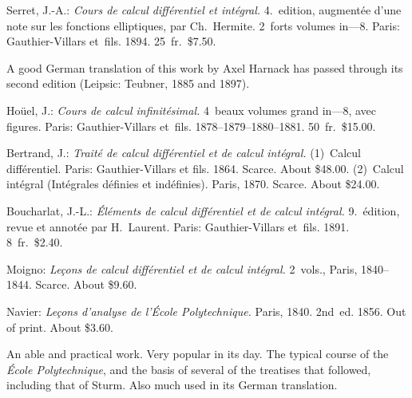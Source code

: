 \documentclass[12pt]{book}[2005/09/16]
\newcommand{\Typo}[2]{#2}
\newlength{\ParIndent}
\newenvironment{Book}{\medskip\par\noindent\hangindent\ParIndent\ignorespaces}{\par}
\newenvironment{Descrip}{%
  \begin{list}{}{%
      \setlength{\leftmargin}{1.5\ParIndent}%
      \setlength{\itemindent}{\ParIndent}%
      \setlength{\listparindent}{\ParIndent}%
      \setlength{\topsep}{4pt}%
      \item\small\ignorespaces%
  }%
}{%
\end{list}}
\newcommand{\Pagelabel}[1]{\phantomsection\label{page:#1}}
\newcommand{\PageSep}[1]{\Pagelabel{#1}\ignorespaces}
\renewcommand{\(}{{\upshape(}}
\renewcommand{\)}{{\upshape)}}
\newcommand{\Title}[1]{\textit{#1}}
\begin{document}
\begin{Book}
Serret, J.-A.: \Title{Cours de calcul différentiel et intégral.} 4.~edition,
augmentée d'une note sur les fonctions elliptiques, par
Ch.~Hermite. 2~forts volumes in---8. Paris: Gauthier-Villars
et~fils. 1894. 25~fr.\ \$7.50.

\begin{Descrip}
A good German translation of this work by Axel Harnack has
passed through its second edition (Leipsic: Teubner, 1885 and 1897).
\end{Descrip}
\end{Book}
\PageSep{139}

\begin{Book}
Hoüel, J.: \Title{Cours de calcul infinitésimal.} 4~beaux volumes grand
in---8, avec figures. Paris: Gauthier-Villars et~fils. 1878--1879--1880--1881.
50~fr.\ \$15.00.
\end{Book}

\begin{Book}
Bertrand, J.: \Title{Traité de calcul différentiel et de calcul intégral.}
(1)~Calcul différentiel. Paris: Gauthier-Villars et fils. 1864.
Scarce. About \$48.00. (2)~Calcul intégral (Intégrales définies
et indéfinies). Paris, 1870. Scarce. About \$24.00.
\end{Book}

\begin{Book}
Boucharlat, J.-L.: \Title{Éléments de calcul différentiel et de calcul
intégral.} 9.~édition, revue et annotée par H.~Laurent. Paris:
Gauthier-Villars et~fils. 1891. 8~fr.\ \$2.40.
\end{Book}

\begin{Book}
Moigno: \Title{Leçons de calcul différentiel et de calcul intégral\Typo{,}{.}} 2~vols.,
Paris, 1840--1844. Scarce. About \$9.60.
\end{Book}

\begin{Book}
Navier: \Title{Leçons d'analyse de l'École Polytechnique.} Paris, 1840.
2nd~ed. 1856. Out of print. About \$3.60.

\begin{Descrip}
An able and practical work. Very popular in its day. The typical
course of the \textit{École Polytechnique}, and the basis of several of the treatises
that followed, including that of Sturm. Also much used in its
German translation.
\end{Descrip}
\end{Book}
\end{document}
